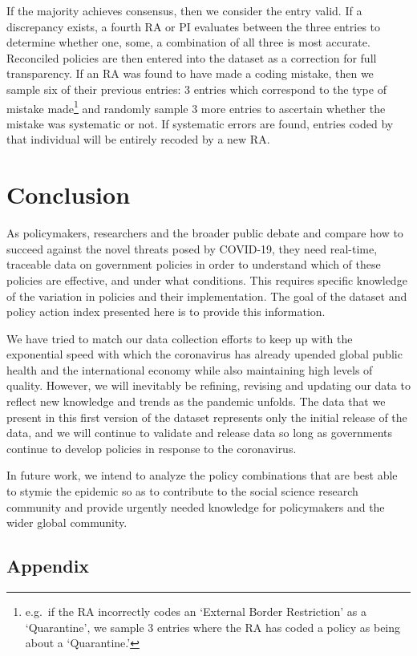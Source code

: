 \documentclass[]{article}
\let\rmarkdownfootnote\footnote%
\def\footnote{\protect\rmarkdownfootnote}
\begin{document}
If the majority achieves consensus, then we consider the entry valid. If a discrepancy exists, a fourth RA or PI evaluates between the three entries to determine whether one, some, a combination of all three is most accurate. Reconciled policies are then entered into the dataset as a correction for full transparency. If an RA was found to have made a coding mistake, then we sample six of their previous entries: 3 entries which correspond to the type of mistake made\footnote{e.g.~if the RA incorrectly codes an `External Border Restriction' as a `Quarantine', we sample 3 entries where the RA has coded a policy as being about a `Quarantine.'} and randomly sample 3 more entries to ascertain whether the mistake was systematic or not. If systematic errors are found, entries coded by that individual will be entirely recoded by a new RA.

\hypertarget{conclusion}{%
\section{Conclusion}\label{conclusion}}

As policymakers, researchers and the broader public debate and compare how to succeed against the novel threats posed by COVID-19, they need real-time, traceable data on government policies in order to understand which of these policies are effective, and under what conditions. This requires specific knowledge of the variation in policies and their implementation. The goal of the dataset and policy action index presented here is to provide this information.

We have tried to match our data collection efforts to keep up with the exponential speed with which the coronavirus has already upended global public health and the international economy while also maintaining high levels of quality. However, we will inevitably be refining, revising and updating our data to reflect new knowledge and trends as the pandemic unfolds. The data that we present in this first version of the dataset represents only the initial release of the data, and we will continue to validate and release data so long as governments continue to develop policies in response to the coronavirus.

In future work, we intend to analyze the policy combinations that are best able to stymie the epidemic so as to contribute to the social science research community and provide urgently needed knowledge for policymakers and the wider global community.

\hypertarget{appendix}{%
\subsection*{Appendix}\label{appendix}}
\end{document}
